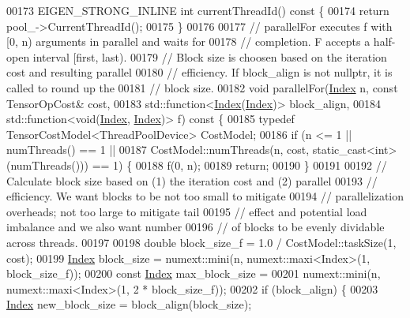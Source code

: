 \begin{DoxyCode}
00173   EIGEN\_STRONG\_INLINE \textcolor{keywordtype}{int} currentThreadId()\textcolor{keyword}{ const }\{
00174     \textcolor{keywordflow}{return} pool\_->CurrentThreadId();
00175   \}
00176 
00177   \textcolor{comment}{// parallelFor executes f with [0, n) arguments in parallel and waits for}
00178   \textcolor{comment}{// completion. F accepts a half-open interval [first, last).}
00179   \textcolor{comment}{// Block size is choosen based on the iteration cost and resulting parallel}
00180   \textcolor{comment}{// efficiency. If block\_align is not nullptr, it is called to round up the}
00181   \textcolor{comment}{// block size.}
00182   \textcolor{keywordtype}{void} parallelFor(\hyperlink{namespace_eigen_a62e77e0933482dafde8fe197d9a2cfde}{Index} n, \textcolor{keyword}{const} TensorOpCost& cost,
00183                    std::function<\hyperlink{namespace_eigen_a62e77e0933482dafde8fe197d9a2cfde}{Index}(\hyperlink{namespace_eigen_a62e77e0933482dafde8fe197d9a2cfde}{Index})> block\_align,
00184                    std::function<\textcolor{keywordtype}{void}(\hyperlink{namespace_eigen_a62e77e0933482dafde8fe197d9a2cfde}{Index}, \hyperlink{namespace_eigen_a62e77e0933482dafde8fe197d9a2cfde}{Index})> f)\textcolor{keyword}{ const }\{
00185     \textcolor{keyword}{typedef} TensorCostModel<ThreadPoolDevice> CostModel;
00186     \textcolor{keywordflow}{if} (n <= 1 || numThreads() == 1 ||
00187         CostModel::numThreads(n, cost, static\_cast<int>(numThreads())) == 1) \{
00188       f(0, n);
00189       \textcolor{keywordflow}{return};
00190     \}
00191 
00192     \textcolor{comment}{// Calculate block size based on (1) the iteration cost and (2) parallel}
00193     \textcolor{comment}{// efficiency. We want blocks to be not too small to mitigate}
00194     \textcolor{comment}{// parallelization overheads; not too large to mitigate tail}
00195     \textcolor{comment}{// effect and potential load imbalance and we also want number}
00196     \textcolor{comment}{// of blocks to be evenly dividable across threads.}
00197 
00198     \textcolor{keywordtype}{double} block\_size\_f = 1.0 / CostModel::taskSize(1, cost);
00199     \hyperlink{namespace_eigen_a62e77e0933482dafde8fe197d9a2cfde}{Index} block\_size = numext::mini(n, numext::maxi<Index>(1, block\_size\_f));
00200     \textcolor{keyword}{const} \hyperlink{namespace_eigen_a62e77e0933482dafde8fe197d9a2cfde}{Index} max\_block\_size =
00201         numext::mini(n, numext::maxi<Index>(1, 2 * block\_size\_f));
00202     \textcolor{keywordflow}{if} (block\_align) \{
00203       \hyperlink{namespace_eigen_a62e77e0933482dafde8fe197d9a2cfde}{Index} new\_block\_size = block\_align(block\_size);

\end{DoxyCode}
